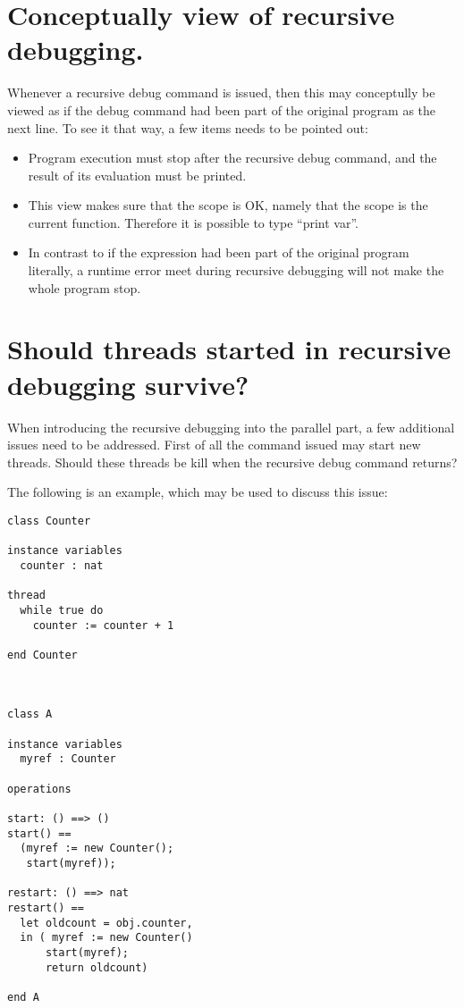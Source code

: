 \documentclass[]{article}
\begin{document}
\section{Conceptually view of recursive debugging.}
\label{sec:concep_view}

Whenever a recursive debug command is issued, then this may conceptully be
viewed as if the debug command had been part of the
original program as the next line. To see it that way, a few items needs
to be pointed out:

\begin{itemize}
\item Program execution must stop after the recursive debug command, and
  the result of its evaluation must be printed.
\item This view makes sure that the scope is OK, namely that the scope is
  the current function. Therefore it is possible to type ``print var''.
\item In contrast to if the expression had been part of the original
  program literally, a runtime error meet during recursive debugging will
  not make the whole program stop.
\end{itemize}




\section{Should threads started in recursive debugging survive?}
\label{sec:survive}

When introducing the recursive debugging into the parallel part, a few
additional issues need to be addressed. First of all the command issued may
start new threads. Should these threads be kill when the recursive debug
command returns? 

The following is an example, which may be used to discuss this issue:

\begin{verbatim}
class Counter

instance variables
  counter : nat

thread
  while true do
    counter := counter + 1    

end Counter



class A

instance variables
  myref : Counter

operations

start: () ==> ()
start() ==
  (myref := new Counter();
   start(myref));

restart: () ==> nat
restart() ==
  let oldcount = obj.counter,
  in ( myref := new Counter()
      start(myref);
      return oldcount)

end A
\end{verbatim}
\end{document}
